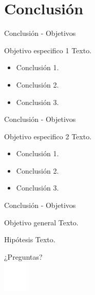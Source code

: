 \documentclass[10pt]{beamer}
\begin{document}
\section{Conclusión}

\begin{frame}{Conclusión - Objetivos}
    \begin{exampleblock}{Objetivo especifico 1}
        Texto.
    \end{exampleblock}
    \begin{itemize}
        \item Conclusión 1.
        \item Conclusión 2.
        \item Conclusión 3.
    \end{itemize}
\end{frame}

\begin{frame}{Conclusión - Objetivos}
    \begin{exampleblock}{Objetivo especifico 2}
        Texto.
    \end{exampleblock}
    \begin{itemize}
        \item Conclusión 1.
        \item Conclusión 2.
        \item Conclusión 3.
    \end{itemize}
\end{frame}


\begin{frame}{Conclusión - Objetivos}
    \begin{block}{Objetivo general}
     Texto.
    \end{block}
    \begin{block}{Hipótesis}
    Texto.
    \end{block}
\end{frame}

\begin{frame}[standout]
  ¿Preguntas? \\
  \includegraphics[height=1.5cm]{images/logos/logo-onlyescudo-usach-white.pdf}
\end{frame}

\appendix
\end{document}
